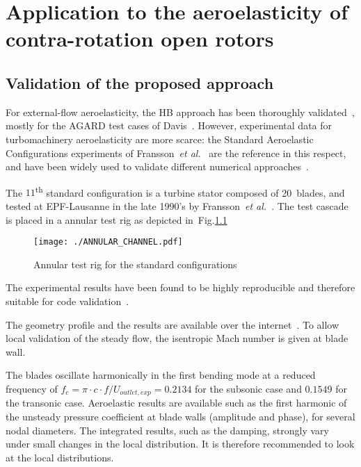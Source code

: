 \chapter{Application to the aeroelasticity of contra-rotation open rotors} %
\label{cha:application_to_the_aeroelasticity_of_contra_rotation_open_rotors}


\section{Validation of the proposed approach} %
\label{sec:validation_of_the_proposed_approach}


For external-flow aeroelasticity, the HB approach has 
been thoroughly validated~\cite{Gopinath2005,Sicot2008,Woodgate2009,Dufour2010}, 
mostly for the AGARD test cases of Davis~\cite{Davis1982}. 
However, experimental data for turbomachinery aeroelasticity are more scarce: 
the Standard Aeroelastic Configurations experiments 
of Fransson~\textit{et al.}~\cite{Fransson:1999uq} are the 
reference in this respect, and have been widely used 
to validate different numerical approaches~\cite{Sbardella:2001fk,
Duta:2002uq,Campobasso:2003fk,Cinnella2004,mcbean2005}. 


The $11$\textsuperscript{th} standard configuration is a
turbine stator composed of 20~blades, and tested at EPF-Lausanne
in the late 1990's by Fransson~\emph{et al.}~\cite{Fransson:1999uq}.
The test cascade is placed in a 
annular test rig as depicted in~Fig.\ref{fig:annular_channel}
\begin{figure}[htbp]
  \centering
  \texttt{[image: ./ANNULAR\_CHANNEL.pdf]}
  \caption{Annular test rig for the standard configurations}
  \label{fig:annular_channel}
\end{figure}
The experimental results have been found to be highly reproducible and
therefore suitable for code validation~\cite{Fransson:1999uq}.  


The geometry profile and the results are available over the
internet~\cite{stcf11web}.  To allow local validation of the steady
flow, the isentropic Mach number is given at blade wall.

The blades oscillate harmonically in the first bending mode
at a reduced frequency of $f_{c} =\pi \cdot c \cdot
f/U_{outlet, exp} = 0.2134$ for the subsonic case and $0.1549$ for the
transonic case. Aeroelastic
results are available such as the first harmonic of the unsteady pressure
coefficient at blade walls (amplitude and phase), for several nodal
diameters. The integrated
results, such as the damping, strongly vary under small changes in the
local distribution. It is therefore recommended to look at the local
distributions.
 

